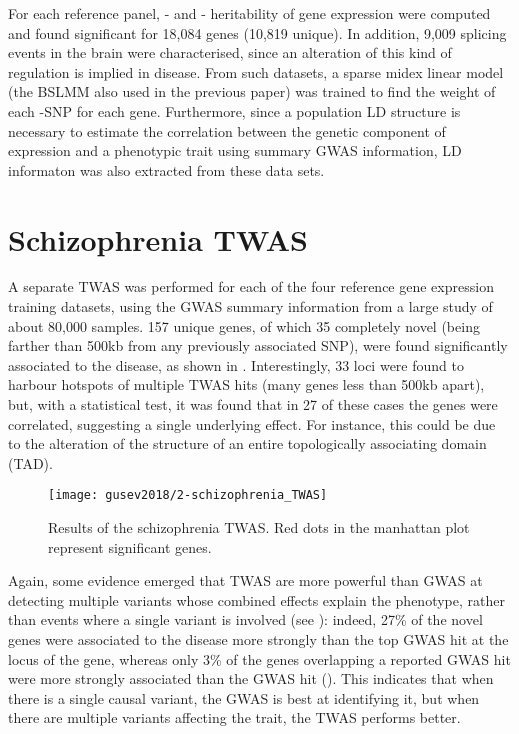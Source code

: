 \documentclass[../main.tex]{subfiles}
\begin{document}
For each reference panel, \cis- and \trans- heritability of gene 
expression were computed and found significant for 18,084 genes (10,819 
unique). In addition, 9,009 splicing events in the brain were 
characterised, since an alteration of this kind of regulation is implied 
in disease. From such datasets, a sparse midex linear model (the BSLMM 
also used in the previous paper) was trained to find the weight of each 
\cis-SNP for each gene. Furthermore, since a population LD structure is 
necessary to estimate the correlation between the genetic component of 
expression and a phenotypic trait using summary GWAS information, LD 
informaton was also extracted from these data sets.

\section{Schizophrenia TWAS}

A separate TWAS was performed for each of the four reference gene 
expression training datasets, using the GWAS summary information from a 
large study of about 80,000 samples. 157 unique genes, of which 35 
completely novel (\ie being farther than 500kb from any previously 
associated SNP), were found significantly associated to the disease, as 
shown in . Interestingly, 33 loci were found to 
harbour hotspots of multiple TWAS hits (\ie many genes less than 500kb 
apart), but, with a statistical test, it was found that in 27 of these 
cases the genes were correlated, suggesting a single underlying effect. 
For instance, this could be due to the alteration of the structure of an 
entire topologically associating domain (TAD).


\begin{figure}
	\centering
	\texttt{[image: gusev2018/2-schizophrenia\_TWAS]}
	\caption{Results of the schizophrenia TWAS. Red dots in the 
manhattan plot represent significant genes.}
\end{figure}

Again, some evidence emerged that TWAS are more powerful than GWAS at 
detecting multiple variants whose combined effects explain the 
phenotype, rather than events where a single variant is involved (see 
): indeed, 27\% of the novel genes were 
associated to the disease more strongly than the top GWAS hit at the 
locus of the gene, whereas only 3\% of the genes overlapping a reported 
GWAS hit were more strongly associated than the GWAS hit 
(). This indicates that when there is a single 
causal variant, the GWAS is best at identifying it, but when there are 
multiple variants affecting the trait, the TWAS performs better.
\end{document}
